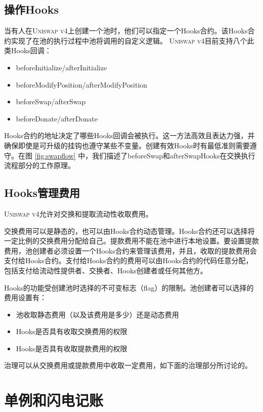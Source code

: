 \documentclass[sigconf,nonacm,prologue,table]{acmart}
\numberwithin{equation}{section}
\theoremstyle{definition}
\theoremstyle{remark}
\begin{document}
\subsection{操作Hooks} 
\label{actionhooks}

当有人在\textsc{Uniswap v4}上创建一个池时，他们可以指定一个Hooks合约。该Hooks合约实现了在池的执行过程中池将调用的自定义逻辑。 \textsc{Uniswap v4}目前支持八个此类Hooks回调：

\begin{itemize}
\item beforeInitialize/afterInitialize
\item beforeModifyPosition/afterModifyPosition
\item beforeSwap/afterSwap
\item beforeDonate/afterDonate
\end{itemize}

Hooks合约的地址决定了哪些Hooks回调会被执行。这一方法高效且表达力强，并确保即使是可升级的挂钩也遵守某些不变量。创建有效Hooks时有最低准则需要遵守。在图 \ref{fig:swapflow} 中，我们描述了beforeSwap和afterSwapHooks在交换执行流程部分的工作原理。

\subsection{Hooks管理费用} 
\label{hookfees}

\textsc{Uniswap v4}允许对交换和提取流动性收取费用。

交换费用可以是静态的，也可以由Hooks合约动态管理。Hooks合约还可以选择将一定比例的交换费用分配给自己。提款费用不能在池中进行本地设置。要设置提款费用，池创建者必须设置一个Hooks合约来管理该费用，并且，收取的提款费用会支付给Hooks合约。支付给Hooks合约的费用可以由Hooks合约的代码任意分配，包括支付给流动性提供者、交换者、Hooks创建者或任何其他方。

Hooks的功能受创建池时选择的不可变标志（flag）的限制。池创建者可以选择的费用设置有：
\begin{itemize}
    \item 池收取静态费用（以及该费用是多少）还是动态费用
    \item Hooks是否具有收取交换费用的权限
    \item Hooks是否具有收取提款费用的权限
\end{itemize}

治理可以从交换费用或提款费用中收取一定费用，如下面的治理部分所讨论的。 

\section{单例和闪电记账} 
\label{flashaccounting}
\end{document}
